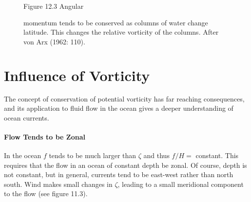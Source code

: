 \begin{figure}[b!]
\centering
\footnotesize
Figure 12.3 Angular \rule{0pt}{6ex}momentum tends to be conserved as
columns of water change latitude. This changes the relative vorticity
of the columns. After von Arx (1962: 110).

\label{fig:planetaryvorticity}
\end{figure}

\section{Influence of Vorticity}
The concept of
conservation of potential vorticity has far reaching consequences, and
its application to fluid flow in the ocean gives a deeper
understanding of ocean currents.

\paragraph{Flow Tends to be Zonal} In the ocean $f$ tends to be much larger than
 $\zeta$ and thus $f/H = $ constant. This requires that the flow in an
ocean of constant depth be zonal. Of course, depth is not constant,
but in general, currents tend to be east-west rather than north
south. Wind makes small changes in $\zeta$, leading to a small
meridional component to the flow (see figure 11.3).

